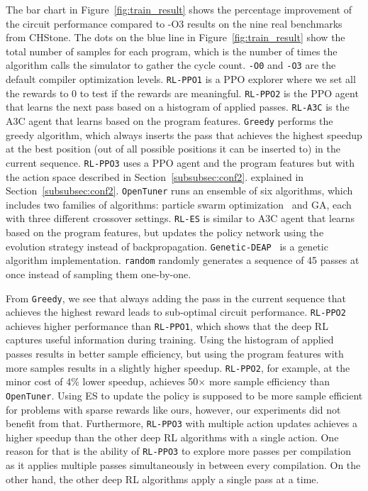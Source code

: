 The bar chart in Figure~\ref{fig:train_result} shows the percentage improvement of the circuit performance compared to -O3 results on the nine real benchmarks from CHStone. The dots on the blue line in Figure~\ref{fig:train_result} show the total number of samples for each program, which is the number of times the algorithm calls the simulator to gather the cycle count.   
\texttt{-O0} and \texttt{-O3} are the default compiler optimization levels. 
\texttt{RL-PPO1} is a PPO explorer where we set all the rewards to 0 to test if the rewards are meaningful. 
\texttt{RL-PPO2} is the PPO agent that learns the next pass based on a histogram of applied passes. 
\texttt{RL-A3C} is the A3C agent that learns based on the program features.
\texttt{Greedy} performs the greedy algorithm, which always inserts the pass that achieves the highest speedup at the best position (out of all possible positions it can be inserted to) in the current sequence. 
\texttt{RL-PPO3} uses a PPO agent and the program features but with the action space described in Section~\ref{subsubsec:conf2}.
explained in Section~\ref{subsubsec:conf2}. 
\texttt{OpenTuner} runs an ensemble of six algorithms, which includes two families of algorithms: particle swarm optimization~\cite{kennedy2010particle} and GA,
each with three different crossover settings. %
\texttt{RL-ES} is similar to A3C agent that learns based on the program features, but updates the policy network using the evolution strategy instead of backpropagation.  
\texttt{Genetic-DEAP}~\cite{DEAP_JMLR2012} is a genetic algorithm implementation. 
\texttt{random} randomly generates a sequence of 45 passes at once instead of sampling them one-by-one.  

From \texttt{Greedy}, we see that always adding the pass in the current sequence that achieves the highest reward leads to sub-optimal circuit performance.
\texttt{RL-PPO2} achieves higher performance than \texttt{RL-PPO1}, which shows that the deep RL captures useful information during training. Using the histogram of applied passes results in better sample efficiency, but using the program features with more samples results in a slightly higher speedup.  
\texttt{RL-PPO2}, for example, at the minor cost of 4\% lower speedup, achieves 50$\times$ more sample efficiency than \texttt{OpenTuner}. 
Using ES to update the policy is supposed to be more sample efficient for problems with sparse rewards like ours, however, our experiments did not benefit from that. 
Furthermore, \texttt{RL-PPO3} with multiple action updates achieves a higher speedup than the other deep RL algorithms with a single action. One reason for that is  the ability of \texttt{RL-PPO3} to explore more passes per compilation as it applies multiple passes simultaneously in between every compilation. On the other hand, the other deep RL algorithms apply a single pass at a time. 

